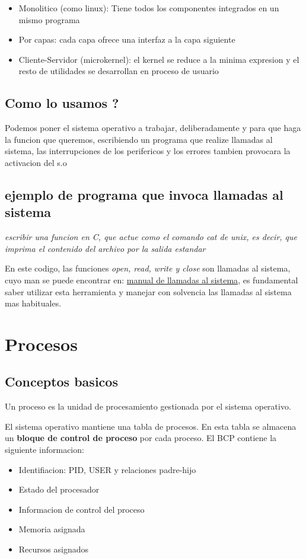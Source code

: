 \documentclass[12pt, letterpaper]{article}
\begin{document}
\begin{itemize}
	\item{Monolitico (como linux): Tiene todos los componentes integrados en un mismo programa}
	\item{Por capas: cada capa ofrece una interfaz a la capa siguiente}
	\item{Cliente-Servidor (microkernel): el kernel se reduce a la minima expresion y el resto de utilidades se desarrollan en proceso de usuario}
\end{itemize}

\subsection{Como lo usamos ?}

Podemos poner el sistema operativo a trabajar, deliberadamente y para que haga la funcion que queremos, escribiendo un programa que realize llamadas al sistema, las interrupciones de los perifericos y los errores tambien provocara la activacion del s.o

\subsection{ejemplo de programa que invoca llamadas al sistema}
\textit{escribir una funcion en C, que actue como el comando cat de unix, es decir, que imprima el contenido del archivo por la salida estandar}



En este codigo, las funciones \textit{open, read, write y close} son llamadas al sistema, cuyo man se puede encontrar en: \href{http://man7.org/linux/man-pages/man2/}{manual de llamadas al sistema}, es fundamental saber utilizar esta herramienta y manejar con solvencia las llamadas al sistema mas habituales.

\section{Procesos}

\subsection{Conceptos basicos}
Un proceso es la unidad de procesamiento gestionada por el sistema operativo.\par
El sistema operativo mantiene una tabla de procesos. En esta tabla se almacena un \textbf{bloque de control de proceso} por cada proceso.
El BCP contiene la siguiente informacion:
\begin{itemize}
	\item{Identifiacion: PID, USER y relaciones padre-hijo}
	\item{Estado del procesador}
	\item{Informacion de control del proceso}
	\item{Memoria asignada}
	\item{Recursos asignados}
\end{itemize}
\end{document}
